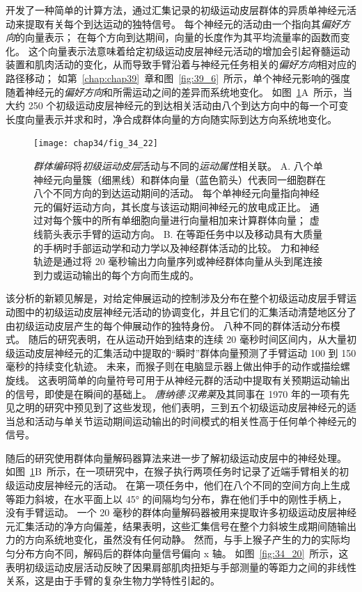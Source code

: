 开发了一种简单的计算方法，通过汇集记录的初级运动皮层群体的异质单神经元活动来提取有关每个到达运动的独特信号。
每个神经元的活动由一个指向其\textit{偏好方向}的向量表示；
在每个方向到达期间，向量的长度作为其平均流量率的函数而变化。
这个向量表示法意味着给定初级运动皮层神经元活动的增加会引起脊髓运动装置和肌肉活动的变化，从而导致手臂沿着与神经元任务相关的\textit{偏好方向}相对应的路径移动；
如第~\ref{chap:chap39}~章和图~\ref{fig:39_6}~所示，单个神经元影响的强度随着神经元的\textit{偏好方向}和所需运动之间的差异而系统地变化。
如图~\ref{fig:34_22}A~所示，当大约 250 个初级运动皮层神经元的到达相关活动由八个到达方向中的每一个可变长度向量表示并求和时，净合成群体向量的方向随实际到达方向系统地变化。


\begin{figure}[htbp]
	\centering
	\texttt{[image: chap34/fig\_34\_22]}
	\caption{\textit{群体编码}将\textit{初级运动皮层}活动与不同的\textit{运动属性}相关联。
		A. 八个单神经元向量簇（细黑线）和群体向量（蓝色箭头）代表同一细胞群在八个不同方向的到达运动期间的活动。
		每个单神经元向量指向神经元的偏好运动方向，其长度与该运动期间神经元的放电成正比。
		通过对每个簇中的所有单细胞向量进行向量相加来计算群体向量；
		虚线箭头表示手臂的运动方向\cite{georgopoulos1983spatial}。
		B. 在等距任务中以及移动具有大质量的手柄时手部运动学和动力学以及神经群体活动的比较。
		力和神经轨迹是通过将 20 毫秒输出力向量序列或神经群体向量从头到尾连接到力或运动输出的每个方向而生成的。}
	\label{fig:34_22}
\end{figure}


该分析的新颖见解是，对给定伸展运动的控制涉及分布在整个初级运动皮层手臂运动图中的初级运动皮层神经元活动的协调变化，并且它们的汇集活动清楚地区分了由初级运动皮层产生的每个伸展动作的独特身份。
八种不同的群体活动分布模式。
随后的研究表明，在从运动开始到结束的连续 20 毫秒时间区间内，从大量初级运动皮层神经元的汇集活动中提取的“瞬时”群体向量预测了手臂运动 100 到 150 毫秒的持续变化轨迹。
未来，而猴子则在电脑显示器上做出伸手的动作或描绘螺旋线。
这表明简单的向量符号可用于从神经元群的活动中提取有关预期运动输出的信号，即使是在瞬间的基础上。
\textit{唐纳德$\cdot$汉弗莱}及其同事在 1970 年的一项有先见之明的研究中预见到了这些发现，他们表明，三到五个初级运动皮层神经元的适当总和活动与单关节运动期间运动输出的时间模式的相关性高于任何单个神经元的信号。


随后的研究使用群体向量解码器算法来进一步了解初级运动皮层中的神经处理。
如图~\ref{fig:34_22}B~所示，在一项研究中，在猴子执行两项任务时记录了近端手臂相关的初级运动皮层神经元的活动。
在第一项任务中，他们在八个不同的空间方向上生成等距力斜坡，在水平面上以 45° 的间隔均匀分布，靠在他们手中的刚性手柄上，没有手臂运动。
一个 20 毫秒的群体向量解码器被用来提取许多初级运动皮层神经元汇集活动的净方向偏差，结果表明，这些汇集信号在整个力斜坡生成期间随输出力的方向系统地变化，虽然没有任何动静。
然而，与手上猴子产生的力的实际均匀分布方向不同，解码后的群体向量信号偏向 x 轴。
如图~\ref{fig:34_20}~所示，这表明初级运动皮层活动反映了因果肩部肌肉扭矩与手部测量的等距力之间的非线性关系，这是由于手臂的复杂生物力学特性引起的。


